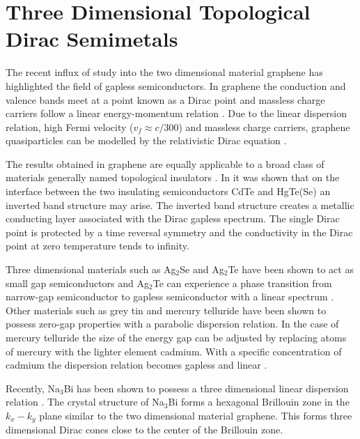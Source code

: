 %
	\chapter{Three Dimensional Topological Dirac Semimetals}
	\label{weyl}
		The recent influx of study into the two dimensional material graphene has highlighted the field of gapless semiconductors. In graphene the conduction and valence bands meet at a point known as a Dirac point \cite{b1} and massless charge carriers follow a linear energy-momentum relation \cite{b11}. Due to the linear dispersion relation, high Fermi velocity ($v_{f}\approx c/300$) and massless charge carriers, graphene quasiparticles can be modelled by the relativistic Dirac equation \cite{b12}.

		The results obtained in graphene are equally applicable to a broad class of materials generally named topological insulators \cite{b41, b71}.  In \cite{b41} it was shown that on the interface between the two insulating semiconductors CdTe and HgTe(Se) an inverted band structure may arise. The inverted band structure creates a metallic conducting layer associated with the Dirac gapless spectrum. The single Dirac point is protected by a time reversal symmetry and the conductivity in the Dirac point at zero temperature tends to infinity.

		Three dimensional materials such as Ag$_{2}$Se and Ag$_{2}$Te have been shown to act as small gap semiconductors \cite{b23, b24} and Ag$_{2}$Te can experience a phase transition from narrow-gap semiconductor to gapless semiconductor with a linear spectrum \cite{b25}. Other materials such as grey tin \cite{b26} and mercury telluride \cite{b27} have been shown to possess zero-gap properties with a parabolic dispersion relation. In the case of mercury telluride the size of the energy gap can be adjusted by replacing atoms of mercury with the lighter element cadmium. With a specific concentration of cadmium the dispersion relation becomes gapless and linear \cite{b28}.
		
		Recently, Na$_{3}$Bi has been shown to possess a three dimensional linear dispersion relation \cite{b29}. The crystal structure of Na$_{3}$Bi forms a hexagonal Brillouin zone in the $k_{x}-k_{y}$ plane similar to the two dimensional material graphene. This forms three dimensional Dirac cones close to the center of the Brillouin zone.
		
